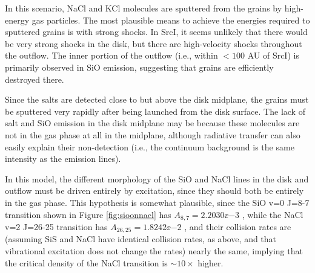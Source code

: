\documentclass[twocolumn]{aastex62}
\newcommand{\sourcei}{SrcI\xspace}
\begin{document}




In this scenario,  NaCl and KCl molecules are sputtered from the grains by
high-energy gas particles.  The most plausible means to achieve the energies
required to sputtered grains is with strong shocks.  In \sourcei, it seems
unlikely that there would be very strong shocks in the disk, but there are
high-velocity shocks throughout the outflow.  The inner portion of the outflow
(i.e., within $<100$ AU of \sourcei) is primarily observed in SiO emission,
suggesting that grains are efficiently destroyed there.

Since the salts are detected close to but above the disk midplane, the
grains must be sputtered very rapidly after being launched from the disk surface.
The lack of salt and SiO emission in the disk midplane may be because these
molecules are not in the gas phase at all in the midplane, although radiative
transfer can also easily explain their non-detection (i.e., the continuum
background is the same intensity as the emission lines).


In this model, the different morphology of the SiO and NaCl lines in the disk
and outflow must be driven entirely by excitation, since they should both be
entirely in the gas phase.  This hypothesis is somewhat plausible, since the
SiO v=0 J=8-7 transition shown in Figure \ref{fig:sioonnacl} has $A_{8,7} =
2.2030\ee{-3}$ \pers, while the NaCl v=2 J=26-25 transition has $A_{26,25} =
1.8242\ee{-2}$ \pers, and their collision rates are (assuming SiS and NaCl have
identical collision rates, as above, and that vibrational excitation does not
change the rates) nearly the same, implying that the critical density of the
NaCl transition is $\sim10\times$ higher.
\end{document}
